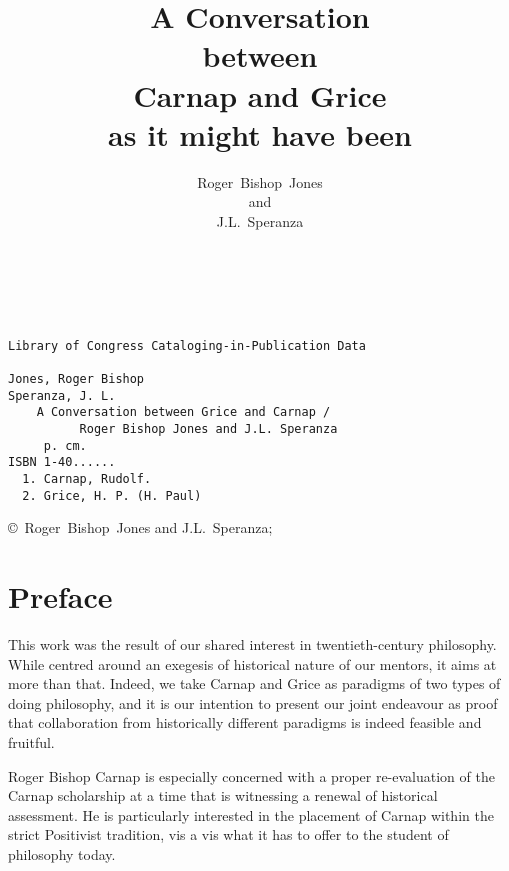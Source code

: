 \documentclass[10pt,titlepage]{book}
\title{A Conversation\\{\small between}\\Carnap and Grice\\{\small as it might have been}}
\author{Roger~Bishop~Jones\\\small{and}\\J.L.~Speranza}
\date{\ }
\begin{document}
\frontmatter
                               
\begin{titlepage}
\maketitle

\vfill


\begin{centering}

{\footnotesize
\begin{verbatim}

Library of Congress Cataloging-in-Publication Data

Jones, Roger Bishop
Speranza, J. L.
    A Conversation between Grice and Carnap /
          Roger Bishop Jones and J.L. Speranza
     p. cm.
ISBN 1-40......
  1. Carnap, Rudolf.
  2. Grice, H. P. (H. Paul)

\end{verbatim}

\copyright\ Roger~Bishop~Jones and J.L.~Speranza;
}%

\end{centering}
\end{titlepage}

\setcounter{tocdepth}{2}
{\parskip-0pt\tableofcontents}

\mainmatter


\section*{Preface}
This work was the result of our shared interest in twentieth-century  
philosophy. While centred around an exegesis of historical nature of our  
mentors, it aims at more than that. Indeed, we take Carnap and Grice as  paradigms 
of two types of doing philosophy, and it is our intention to present  our 
joint endeavour as proof that collaboration from historically different  
paradigms is indeed feasible and fruitful.
 
Roger Bishop Carnap is especially concerned with a proper re-evaluation of  
the Carnap scholarship at a time that is witnessing a renewal of historical 
 assessment. He is particularly interested in the placement of Carnap 
within the  strict Positivist tradition, vis a vis what it has to offer to the 
student of  philosophy today.
 
\end{document}
